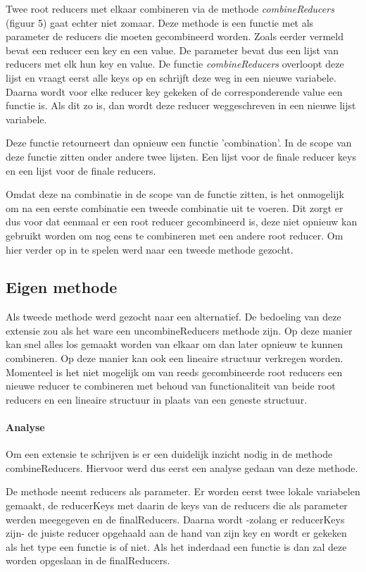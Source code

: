 Twee root reducers met elkaar combineren via de methode \textit{combineReducers} (figuur 5) gaat echter niet zomaar. Deze methode is een functie met als parameter de reducers die moeten gecombineerd worden. Zoals eerder vermeld bevat een reducer een key en een value. De parameter bevat dus een lijst van reducers met elk hun key en value. De functie \textit{combineReducers} overloopt deze lijst en vraagt eerst alle keys op en schrijft deze weg in een nieuwe variabele. Daarna wordt voor elke reducer key gekeken of de corresponderende value een functie is. Als dit zo is, dan wordt deze reducer weggeschreven in een nieuwe lijst variabele.   

Deze functie retourneert dan opnieuw een functie 'combination'. In de scope van deze functie zitten onder andere twee lijsten. Een lijst voor de finale reducer keys en een lijst voor de finale reducers. 
 
Omdat deze na combinatie in de scope van de functie zitten, is het onmogelijk om na een eerste combinatie een tweede combinatie uit te voeren. Dit zorgt er dus voor dat eenmaal er een root reducer gecombineerd is, deze niet opnieuw kan gebruikt worden om nog eens te combineren met een andere root reducer. Om hier verder op in te spelen werd naar een tweede methode gezocht. 

\subsection{Eigen methode}
Als tweede methode werd gezocht naar een alternatief. De bedoeling van deze extensie zou als het ware een uncombineReducers methode zijn. Op deze manier kan snel alles los gemaakt worden van elkaar om dan later opnieuw te kunnen combineren. Op deze manier kan ook een lineaire structuur verkregen worden. Momenteel is het niet mogelijk om van reeds gecombineerde root reducers een nieuwe reducer te combineren met behoud van functionaliteit van beide root reducers en een lineaire structuur in plaats van een geneste structuur. 

\paragraph{Analyse}
Om een extensie te schrijven is er een duidelijk inzicht nodig in de methode combineReducers. Hiervoor werd dus eerst een analyse gedaan van deze methode. 

De methode neemt reducers als parameter. Er worden eerst twee lokale variabelen gemaakt, de reducerKeys met daarin de keys van de reducers die als parameter werden meegegeven en de finalReducers. Daarna wordt -zolang er reducerKeys zijn- de juiste reducer opgehaald aan de hand van zijn key en wordt er gekeken als het type een functie is of niet. Als het inderdaad een functie is dan zal deze worden opgeslaan in de finalReducers.

